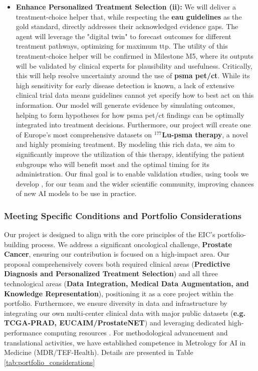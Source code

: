 \documentclass[11pt, a4paper]{article}
\begin{document}
\begin{itemize}
    \item \textbf{Enhance Personalized Treatment Selection (ii):} We will deliver a treatment-choice helper that, while respecting the \textbf{\gls{eau} guidelines} as the gold standard, directly addresses their acknowledged evidence gaps. The agent will leverage the "digital twin" to forecast outcomes for different treatment pathways, optimizing for maximum \gls{ttp}. The utility of this treatment-choice helper will be confirmed in Milestone M5, where its outputs will be validated by clinical experts for plausibility and usefulness. Critically, this will help resolve uncertainty around the use of \textbf{\gls{psma} \gls{pet}/\gls{ct}}. While its high sensitivity for early disease detection is known, a lack of extensive clinical trial data means guidelines cannot yet specify how to best act on this information. Our model will generate evidence by simulating outcomes, helping to form hypotheses for how \gls{psma} \gls{pet}/\gls{ct} findings can be optimally integrated into treatment decisions. Furthermore, our project will create one of Europe's most comprehensive datasets on \textbf{$^{177}$Lu-\gls{psma} therapy}, a novel and highly promising treatment. By modeling this rich data, we aim to significantly improve the utilization of this therapy, identifying the patient subgroups who will benefit most and the optimal timing for its administration. Our final goal is to enable validation studies, using tools we develop , for our team and the wider scientific community, improving chances of new AI models to be use in practice. 
\end{itemize}

\subsubsection*{Meeting Specific Conditions and Portfolio Considerations}
Our project is designed to align with the core principles of the EIC's portfolio-building process. We address a significant oncological challenge, \textbf{Prostate Cancer}, ensuring our contribution is focused on a high-impact area. Our proposal comprehensively covers both required clinical areas (\textbf{Predictive Diagnosis and Personalized Treatment Selection}) and all three technological areas (\textbf{Data Integration, Medical Data Augmentation, and Knowledge Representation}), positioning it as a core project within the portfolio. Furthermore, we ensure diversity in data and infrastructure by integrating our own multi-center clinical data with major public datasets (\textbf{e.g. TCGA-PRAD, EUCAIM/ProstateNET}) and leveraging dedicated high-performance computing resources . For methodological advancement and translational activities, we have established competence in Metrology for AI in Medicine (MDR/TEF-Health). Details are presented in Table \ref{tab:portfolio_considerations}
\end{document}
